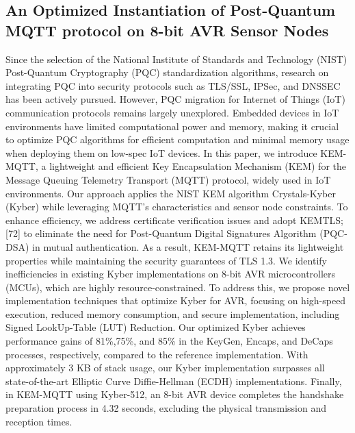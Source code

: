 \documentclass[11pt]{article}
\theoremstyle{definition}
\theoremstyle{remark}
\theoremstyle{plain}
\begin{document}
\subsection{\cite{10.1145/3708821.3733873} An Optimized Instantiation of Post-Quantum MQTT protocol on 8-bit AVR Sensor Nodes}
Since the selection of the National Institute of Standards and Technology (NIST) Post-Quantum Cryptography (PQC) standardization algorithms, research on integrating PQC into security protocols such as TLS/SSL, IPSec, and DNSSEC has been actively pursued. However, PQC migration for Internet of Things (IoT) communication protocols remains largely unexplored. Embedded devices in IoT environments have limited computational power and memory, making it crucial to optimize PQC algorithms for efficient computation and minimal memory usage when deploying them on low-spec IoT devices. In this paper, we introduce KEM-MQTT, a lightweight and efficient Key Encapsulation Mechanism (KEM) for the Message Queuing Telemetry Transport (MQTT) protocol, widely used in IoT environments. Our approach applies the NIST KEM algorithm Crystals-Kyber (Kyber) while leveraging MQTT’s characteristics and sensor node constraints. To enhance efficiency, we address certificate verification issues and adopt KEMTLS;[72] to eliminate the need for Post-Quantum Digital Signatures Algorithm (PQC-DSA) in mutual authentication. As a result, KEM-MQTT retains its lightweight properties while maintaining the security guarantees of TLS 1.3. We identify inefficiencies in existing Kyber implementations on 8-bit AVR microcontrollers (MCUs), which are highly resource-constrained. To address this, we propose novel implementation techniques that optimize Kyber for AVR, focusing on high-speed execution, reduced memory consumption, and secure implementation, including Signed LookUp-Table (LUT) Reduction. Our optimized Kyber achieves performance gains of 81\%,75\%, and 85\% in the KeyGen, Encaps, and DeCaps processes, respectively, compared to the reference implementation. With approximately 3 KB of stack usage, our Kyber implementation surpasses all state-of-the-art Elliptic Curve Diffie-Hellman (ECDH) implementations. Finally, in KEM-MQTT using Kyber-512, an 8-bit AVR device completes the handshake preparation process in 4.32 seconds, excluding the physical transmission and reception times.
\end{document}
